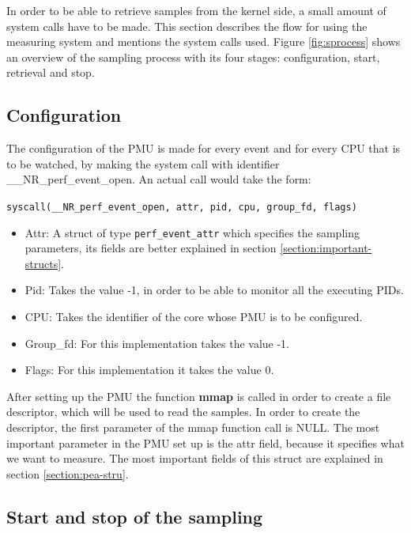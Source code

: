 In order to be able to retrieve samples from the kernel side, a small amount of system calls have to be made. This section describes the flow for using the measuring system and mentions the system calls used. Figure \ref{fig:sprocess} shows an overview of the sampling process with its four stages: configuration, start, retrieval and stop.

\subsection{Configuration}\label{section:confgtn}
The configuration of the PMU is made for every event and for every CPU that is to be watched, by making the system call with identifier \_\_NR\_perf\_event\_open. An actual call would take the form: 
\\
\begin{center}
\texttt{syscall(\_\_NR\_perf\_event\_open, attr, pid, cpu, group\_fd, flags) }
\end{center}

\begin{itemize}
	\item Attr: A struct of type \texttt{perf\_event\_attr} which specifies the sampling parameters, its fields are better explained in section \ref{section:important-structs}. 
	\item Pid: Takes the value -1, in order to be able to monitor all the executing PIDs.
	\item CPU: Takes the identifier of the core whose PMU is to be configured.
	\item Group\_fd: For this implementation takes the value -1.
	\item Flags: For this implementation it takes the value 0.
\end{itemize}

After setting up the PMU the function \textbf{mmap} is called in order to create a file descriptor, which will be used to read the samples. In order to create the descriptor, the first parameter of the mmap function call is NULL. The most important parameter in the PMU set up is the attr field, because it specifies what we want to measure. The most important fields of this struct are explained in section \ref{section:pea-stru}.  

\subsection{Start and stop of the sampling}\label{section:start-sto}

